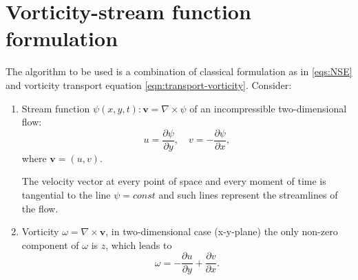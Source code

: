 \documentclass{article}
\numberwithin{equation}{section}
\begin{document}
\pagebreak
\section{Vorticity-stream function formulation}\label{sec:vorticity-streamfunction}
	The algorithm to be used is a combination of classical formulation as in \cref{eqs:NSE} and vorticity transport equation \cref{eqn:transport-vorticity}.
	Consider:
	
	\begin{enumerate}
	\item	

	Stream function $\psi(x,y,t):\boldsymbol{v}=\nabla \times \psi$ of an incompressible two-dimensional flow:
	\begin{equation}
	\label{eqn:streamfunction}
		u = \frac{\partial \psi}{\partial y},\quad v=-\frac{\partial \psi}{\partial x},
	\end{equation}
	where $\boldsymbol{v}=(u,v)$.
	
	The velocity vector at every point of space and every moment of time is tangential to the line $\psi = const$ and such lines represent the streamlines of the flow. 
	\item
	
	Vorticity $\omega = \nabla \times \boldsymbol{v}$, in two-dimensional case (x-y-plane) the only non-zero component of $\omega$ is $z$, which leads to
	\begin{equation}
	\label{eqn:vorticity}
		\omega=- \frac{\partial u}{\partial y}+\frac{\partial v}{\partial x} .
	\end{equation}
	\end{enumerate}
	
\end{document}
